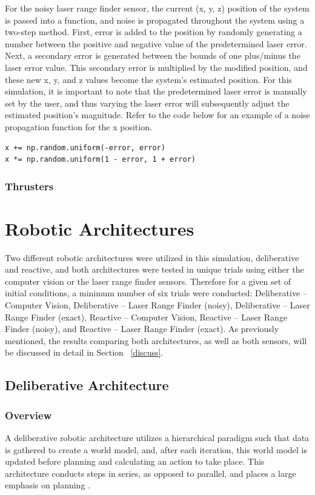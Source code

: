 \documentclass[journal, 10pt]{IEEEtran}
\begin{document}
For the noisy laser range finder sensor, the current (x, y, z) position of the system is passed into a function, and noise is propagated throughout the system using a two-step method. First, error is added to the position by randomly generating a number between the positive and negative value of the predetermined laser error. Next, a secondary error is generated between the bounds of one plus/minus the laser error value. This secondary error is multiplied by the modified position, and these new x, y, and z values become the system's estimated position.  For this simulation, it is important to note that the predetermined laser error is manually set by the user, and thus varying the laser error will subsequently adjust the estimated position's magnitude. Refer to the code below for an example of a noise propagation function for the x position.

\begin{verbatim}
x += np.random.uniform(-error, error)
x *= np.random.uniform(1 - error, 1 + error)
\end{verbatim}

\subsubsection{Thrusters}


\section{Robotic Architectures}
Two different robotic architectures were utilized in this simulation, deliberative and reactive, and both architectures were tested in unique trials using either the computer vision or the laser range finder sensors. Therefore for a given set of initial conditions, a minimum number of six trials were conducted: Deliberative -- Computer Vision, Deliberative -- Laser Range Finder (noisy), Deliberative -- Laser Range Finder (exact), Reactive -- Computer Vision, Reactive -- Laser Range Finder (noisy), and Reactive -- Laser Range Finder (exact). As previously mentioned, the results comparing both architectures, as well as both sensors, will be discussed in detail in Section ~\ref{discuss}.

\subsection{Deliberative Architecture}
\subsubsection{Overview}
A deliberative robotic architecture utilizes a hierarchical paradigm such that data is gathered to create a world model, and, after each iteration, this world model is updated before planning and calculating an action to take place. This architecture conducts steps in series, as opposed to parallel, and places a large emphasis on planning \cite{joshi}.
\end{document}
